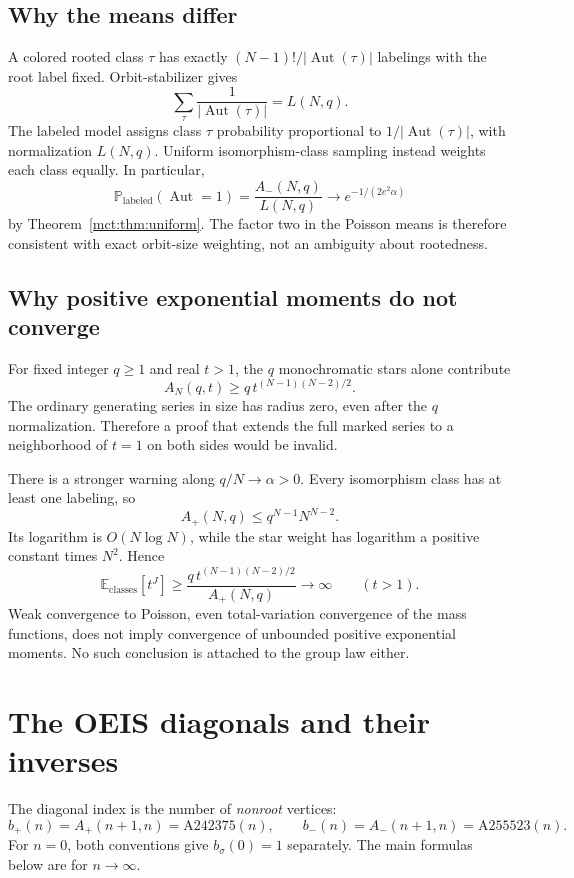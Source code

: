 \documentclass[11pt]{article}
\theoremstyle{definition}
\newcommand{\Aut}{\operatorname{Aut}}
\newcommand{\Prob}{\mathbb P}
\newcommand{\Exp}{\mathbb E}
\begin{document}
\subsection{Why the means differ}
A colored rooted class $\tau$ has exactly $(N-1)!/|\Aut(\tau)|$ labelings with the root label fixed. Orbit-stabilizer gives
\begin{equation}\label{mct:eq:orbit}
 \sum_\tau\frac1{|\Aut(\tau)|}=L(N,q).
\end{equation}
The labeled model assigns class $\tau$ probability proportional to $1/|\Aut(\tau)|$, with normalization $L(N,q)$. Uniform isomorphism-class sampling instead weights each class equally. In particular,
\[
 \Prob_{\mathrm{labeled}}(\Aut=1)=\frac{A_-(N,q)}{L(N,q)}
 \longrightarrow e^{-1/(2e^2\alpha)}
\]
by Theorem~\ref{mct:thm:uniform}. The factor two in the Poisson means is therefore consistent with exact orbit-size weighting, not an ambiguity about rootedness.

\subsection{Why positive exponential moments do not converge}
For fixed integer $q\ge1$ and real $t>1$, the $q$ monochromatic stars alone contribute
\[
 A_N(q,t)\ge q\,t^{(N-1)(N-2)/2}.
\]
The ordinary generating series in size has radius zero, even after the $q$ normalization. Therefore a proof that extends the full marked series to a neighborhood of $t=1$ on both sides would be invalid.

There is a stronger warning along $q/N\to\alpha>0$. Every isomorphism class has at least one labeling, so
\[
 A_+(N,q)\le q^{N-1}N^{N-2}.
\]
Its logarithm is $O(N\log N)$, while the star weight has logarithm a positive constant times $N^2$. Hence
\begin{equation}\label{mct:eq:momentdivergence}
 \Exp_{\mathrm{classes}}[t^J]\ge
 \frac{q\,t^{(N-1)(N-2)/2}}{A_+(N,q)}\longrightarrow\infty
 \qquad(t>1).
\end{equation}
Weak convergence to Poisson, even total-variation convergence of the mass functions, does not imply convergence of unbounded positive exponential moments. No such conclusion is attached to the group law either.

\section{The OEIS diagonals and their inverses}\label{mct:sec:diagonal}
The diagonal index is the number of \emph{nonroot} vertices:
\[
 b_+(n)=A_+(n+1,n)=\text{A242375}(n),\qquad
 b_-(n)=A_-(n+1,n)=\text{A255523}(n).
\]
For $n=0$, both conventions give $b_\sigma(0)=1$ separately. The main formulas below are for $n\to\infty$.
\end{document}
